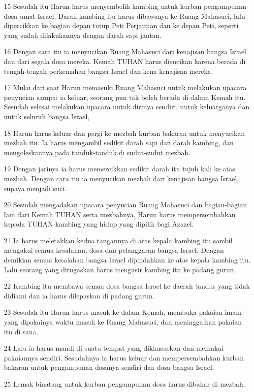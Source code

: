 \par 15 Sesudah itu Harun harus menyembelih kambing untuk kurban pengampunan dosa umat Israel. Darah kambing itu harus dibawanya ke Ruang Mahasuci, lalu dipercikkan ke bagian depan tutup Peti Perjanjian dan ke depan Peti, seperti yang sudah dilakukannya dengan darah sapi jantan.
\par 16 Dengan cara itu ia menyucikan Ruang Mahasuci dari kenajisan bangsa Israel dan dari segala dosa mereka. Kemah TUHAN harus disucikan karena berada di tengah-tengah perkemahan bangsa Israel dan kena kenajisan mereka.
\par 17 Mulai dari saat Harun memasuki Ruang Mahasuci untuk melakukan upacara penyucian sampai ia keluar, seorang pun tak boleh berada di dalam Kemah itu. Sesudah selesai melakukan upacara untuk dirinya sendiri, untuk keluarganya dan untuk seluruh bangsa Israel,
\par 18 Harun harus keluar dan pergi ke mezbah kurban bakaran untuk menyucikan mezbah itu. Ia harus mengambil sedikit darah sapi dan darah kambing, dan mengoleskannya pada tanduk-tanduk di sudut-sudut mezbah.
\par 19 Dengan jarinya ia harus memercikkan sedikit darah itu tujuh kali ke atas mezbah. Dengan cara itu ia menyucikan mezbah dari kenajisan bangsa Israel, supaya menjadi suci.
\par 20 Sesudah mengadakan upacara penyucian Ruang Mahasuci dan bagian-bagian lain dari Kemah TUHAN serta mezbahnya, Harun harus mempersembahkan kepada TUHAN kambing yang hidup yang dipilih bagi Azazel.
\par 21 Ia harus meletakkan kedua tangannya di atas kepala kambing itu sambil mengakui semua kesalahan, dosa dan pelanggaran bangsa Israel. Dengan demikian semua kesalahan bangsa Israel dipindahkan ke atas kepala kambing itu. Lalu seorang yang ditugaskan harus mengusir kambing itu ke padang gurun.
\par 22 Kambing itu membawa semua dosa bangsa Israel ke daerah tandus yang tidak didiami dan ia harus dilepaskan di padang gurun.
\par 23 Sesudah itu Harun harus masuk ke dalam Kemah, membuka pakaian imam yang dipakainya waktu masuk ke Ruang Mahasuci, dan meninggalkan pakaian itu di sana.
\par 24 Lalu ia harus mandi di suatu tempat yang dikhususkan dan memakai pakaiannya sendiri. Sesudahnya ia harus keluar dan mempersembahkan kurban bakaran untuk pengampunan dosanya sendiri dan dosa bangsa Israel.
\par 25 Lemak binatang untuk kurban pengampunan dosa harus dibakar di mezbah.
